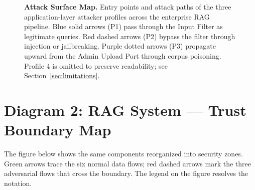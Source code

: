 \documentclass[12pt, a4paper]{report}
\begin{document}
\begin{landscape}
\begin{figure}[p]
\begin{tikzpicture}
\end{tikzpicture}
\hspace{4cm}
\caption{\textbf{Attack Surface Map.} Entry points and attack paths of the
three application-layer attacker profiles across the enterprise RAG pipeline.
Blue solid arrows (P1) pass through the Input Filter as legitimate queries.
Red dashed arrows (P2) bypass the filter through injection or jailbreaking.
Purple dotted arrows (P3) propagate upward from the Admin Upload Port through
corpus poisoning. Profile 4 is omitted to preserve readability; see
Section~\ref{sec:limitations}.}
\label{fig:attack-surface}
\end{figure}
\end{landscape}

\clearpage

\section{Diagram 2: RAG System --- Trust Boundary Map}

The figure below shows the same components reorganized into security
zones. Green arrows trace the six normal data flows; red dashed arrows
mark the three adversarial flows that cross the boundary. The legend on
the figure resolves the notation.
\end{document}
